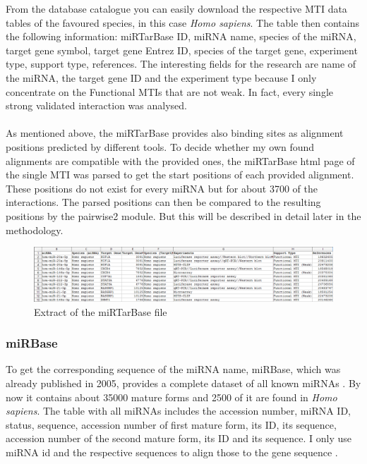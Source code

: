 \documentclass[12pt]{article}
\begin{document}
From the database catalogue you can easily download the respective MTI data tables of the favoured species, in this case \textit{Homo sapiens}. The table then contains the following information: miRTarBase ID, miRNA name, species of the miRNA, target gene symbol, target gene Entrez ID, species of the target gene, experiment type, support type, references. The interesting fields for the research are name of the miRNA, the target gene ID and the experiment type because I only concentrate on the Functional MTIs that are not weak. In fact, every single strong validated interaction was analysed.\\\\

As mentioned above, the miRTarBase provides also binding sites as alignment positions predicted by different tools. To decide whether my own found alignments are compatible with the provided ones, the miRTarBase html page of the single MTI was parsed to get the start positions of each provided alignment. These positions do not exist for every miRNA but for about 3700 of the interactions. The parsed positions can then be compared to the resulting positions by the pairwise2 module. But this will be described in detail later in the methodology. 

\begin{figure}[h]
\centering
\includegraphics[width=\textwidth]{results/mirtarbase_scrot.png}
\caption{Extract of the miRTarBase file}
\label{mirtarbase_scrot}
\end{figure}

\vspace{1cm}


\subsubsection{miRBase}
To get the corresponding sequence of the miRNA name, miRBase, which was already published in 2005, provides a complete dataset of all known miRNAs \cite{Griffiths-Jones}. By now it contains about 35000 mature forms and 2500 of it are found in \textit{Homo sapiens}. The table with all miRNAs includes the accession number, miRNA ID, status, sequence, accession number of first mature form, its ID, its sequence, accession number of the second mature form, its ID and its sequence. I only use miRNA id and the respective sequences to align those to the gene sequence \cite{mirbase}.
\end{document}
